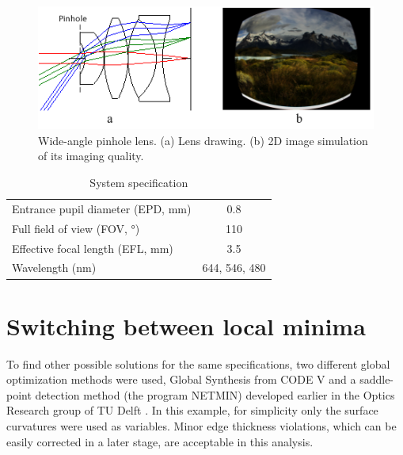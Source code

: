 \begin{figure}[h!]
    \centering
    \includegraphics[scale=0.95]{chapter-3/figures/WidePinLens.png}
    \caption{Wide-angle pinhole lens. (a) Lens drawing. (b) 2D image simulation of its imaging quality.}
    \label{fig:widepinLens}
\end{figure}

\setlength{\arrayrulewidth}{.5mm}
\setlength{\tabcolsep}{18pt}
\renewcommand{\arraystretch}{1.2}
\begin{table}[h!]
    \centering
    \captionsetup{justification=centering}
    \caption{System specification}
    \label{table: sysspec}
    \vspace{-1em}
    \begin{tabular}{ p{20em} c }
    \hline 
    Entrance pupil diameter (EPD, mm) & 0.8\\
    Full field of view (FOV, °) & 110\\
    Effective focal length (EFL, mm) & 3.5\\
    Wavelength (nm) & 644, 546, 480\\
    \hline
    \end{tabular}
\end{table}



\section{Switching between local minima}

To find other possible solutions for the same specifications, two different global optimization methods were used, Global Synthesis from CODE V \cite{KuperGO1992}\cite{RogersGO2006} and a saddle-point detection method (the program NETMIN) developed earlier in the Optics Research group of TU Delft \cite{MarinescuSPD07}. In this example, for simplicity only the surface curvatures were used as variables. Minor edge thickness violations, which can be easily corrected in a later stage, are acceptable in this analysis. 

